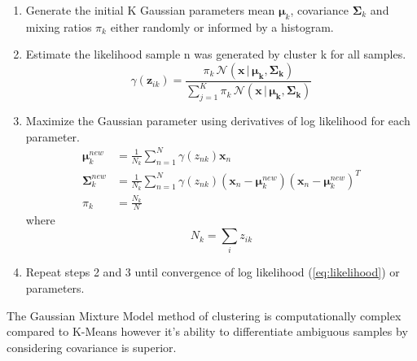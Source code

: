 \begin{enumerate}
	\item Generate the initial K Gaussian parameters mean $\bm{\mu}_{k}$, covariance $\bm{\Sigma}_k$ and mixing ratios $\pi_k$ either randomly or informed by a histogram.
	\item Estimate the likelihood sample n was generated by cluster k for all samples. 
	\begin{equation}
		\gamma(\bm{z}_{ik})=\frac{\pi_k\, \mathcal{N}(\bm{x}\,|\,\bm{\mu_k},\bm{\Sigma_k})}{\sum_{j=1}^{K}\pi_k\, \mathcal{N}(\bm{x}\,|\,\bm{\mu_k},\bm{\Sigma_k})}
	\end{equation}

	\item Maximize the Gaussian parameter using derivatives of log likelihood for each parameter.
	\begin{align}	
	\label{eq:mean}
	\bm{\mu}_{k}^{new} &= \frac{1}{N_k}\sum_{n=1}^N \gamma(z_{nk} ) \bm{x}_n \\
	\label{eq:covariance}
	\bm{\Sigma}_k^{new} &=  \frac{1}{N_k}\sum_{n=1}^N\gamma(z_{nk})(\bm{x}_n- \bm{\mu}_k^{new})(\bm{x}_n - \bm{\mu}_k^{new})^T \\
	\label{eq:ratio}
	\pi_k &= \frac{N_k}{N}
	\end{align}
	where \newline
	\[N_k = \sum_{i} z_{ik}\]
	\item Repeat steps 2 and 3 until convergence of log likelihood (\ref{eq:likelihood}) or parameters. 
\end{enumerate}

The Gaussian Mixture Model method of clustering is computationally complex compared to K-Means however it's ability to differentiate ambiguous samples by considering covariance is superior. 

